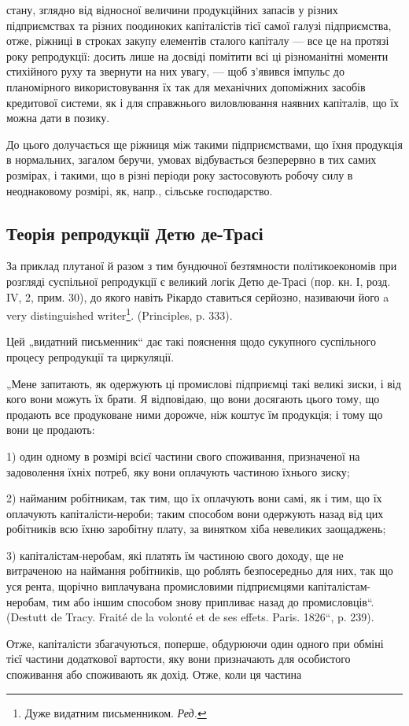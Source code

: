 \parcont{}  %
стану, зглядно від відносної величини продукційних запасів у різних
підприємствах та різних поодиноких капіталістів тієї самої галузі підприємства,
отже, ріжниці в строках закупу елементів сталого капіталу —
все це на протязі року репродукції: досить лише на досвіді помітити
всі ці різноманітні моменти стихійного руху та звернути на них увагу, —
щоб з’явився імпульс до планомірного використовування їх так для механічних
допоміжних засобів кредитової системи, як і для справжнього
виловлювання наявних капіталів, що їх можна дати в позику.

До цього долучається ще ріжниця між такими підприємствами, що
їхня продукція в нормальних, загалом беручи, умовах відбувається
безперервно в тих самих розмірах, і такими, що в різні періоди року
застосовують робочу силу в неоднаковому розмірі, як, напр., сільське
господарство.
\label{original-373-1}

\subsection[Теорія репродукції Детю де-Трасі]{Теорія репродукції Детю де-Трасі\footnotemark{}}

\label{original-373-2}
За
приклад плутаної й разом з тим бундючної безтямности політикоекономів
при розгляді суспільної репродукції є великий логік Детю
де-Трасі (пор. кн. І, розд. IV, 2, прим. 30), до якого навіть Рікардо
ставиться серйозно, називаючи його a very distinguished writer\footnote*{
Дуже видатним письменником. \emph{Ред.}
}. (Principles,
p. 333).

Цей „видатний письменник“ дає такі пояснення щодо сукупного суспільного
процесу репродукції та циркуляції.

„Мене запитають, як одержують ці промислові підприємці такі великі
зиски, і від кого вони можуть їх брати. Я відповідаю, що вони досягають
цього тому, що продають все продуковане ними дорожче, ніж коштує
їм продукція; і тому що вони це продають:

1) один одному в розмірі всієї частини свого споживання, призначеної
на задоволення їхніх потреб, яку вони оплачують частиною їхнього
зиску;

2) найманим робітникам, так тим, що їх оплачують вони самі, як і тим, що їх
оплачують капіталісти-нероби; таким способом вони одержують назад від цих
робітників всю їхню заробітну плату, за винятком хіба невеликих заощаджень;

3) капіталістам-неробам, які платять їм частиною свого доходу, ще
не витраченою на наймання робітників, що роблять безпосередньо для
них, так що уся рента, щорічно виплачувана промисловими підприємцями
капіталістам-неробам, тим або іншим способом знову припливає
назад до промисловців“. (Destutt de Tracy. Fraité de la volonté et de ses
effets. Paris. 1826“, p. 239).

Отже, капіталісти збагачуються, поперше, обдурюючи один одного при
обміні тієї частини додаткової вартости, яку вони призначають для особистого
споживання або споживають як дохід. Отже, коли ця частина
\parbreak{}  %
